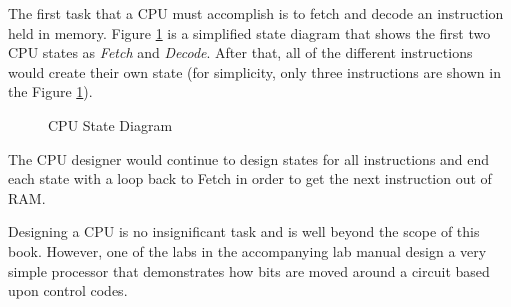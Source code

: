 The first task that a \ac{CPU} must accomplish is to fetch and decode an instruction held in memory. Figure \ref{SIM:fig:cpu_state_diagram} is a simplified state diagram that shows the first two \ac{CPU} states as \emph{Fetch} and \emph{Decode}. After that, all of the different instructions would create their own state (for simplicity, only three instructions are shown in the Figure \ref{SIM:fig:cpu_state_diagram}).

\begin{figure}[H]
  \caption{CPU State Diagram}
  \label{SIM:fig:cpu_state_diagram}
  \myfloatalign
\end{figure}

The \ac{CPU} designer would continue to design states for all instructions and end each state with a loop back to Fetch in order to get the next instruction out of \ac{RAM}.

Designing a \ac{CPU} is no insignificant task and is well beyond the scope of this book. However, one of the labs in the accompanying lab manual design a very simple processor that demonstrates how bits are moved around a circuit based upon control codes.
